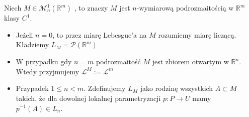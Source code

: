 \begin{defi}
    Niech $M \in \mathcal{M}_n^1(\mathbb{R}^m)$ , to znaczy $M$ jest $n$-wymiarową podrozmaitością w $\mathbb{R}^m$ klasy $C^1$.
    \begin{itemize}
        \item Jeżeli $n=0$, to przez miarę Lebesgue'a na $M$ rozumiemy miarę liczącą. Kładziemy $L_M = \mathcal{P}(\mathbb{R}^m)$
        \item W przypadku gdy $n=m$ podrozmaitość $M$ jest zbiorem otwartym w $\mathbb{R}^n$. Wtedy przyjmujemy $\mathcal{L}^M := \mathcal{L}^m$
        \item Przypadek $1 \leq n < m$. Zdefinujemy $L_M$ jako rodzinę wszystkich $A \subset M$ takich, że dla dowolnej lokalnej parametryzacji $p : P \rightarrow U$ mamy $p^{-1}(A) \in L_n$. 
    \end{itemize}
\end{defi}